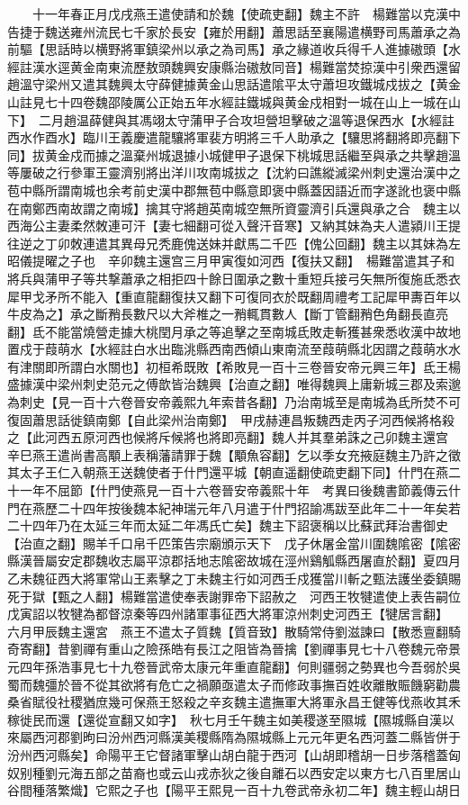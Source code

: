 　　十一年春正月戊戌燕王遣使請和於魏【使疏吏翻】魏主不許　楊難當以克漢中告捷于魏送雍州流民七千家於長安【雍於用翻】蕭思話至襄陽遣横野司馬蕭承之為前驅【思話時以横野將軍鎮梁州以承之為司馬】承之緣道收兵得千人進據磝頭【水經註漢水逕黄金南東流歷敖頭魏興安康縣治磝敖同音】楊難當焚掠漢中引衆西還留趙溫守梁州又遣其魏興太守薛健據黄金山思話遣隂平太守蕭坦攻鐵城戍拔之【黄金山註見七十四卷魏邵陵厲公正始五年水經註鐵城與黄金戍相對一城在山上一城在山下】　二月趙温薛健與其馮翊太守蒲甲子合攻坦營坦擊破之溫等退保西水【水經註西水作酉水】臨川王義慶遣龍驤將軍裴方明將三千人助承之【驤思將翻將即亮翻下同】拔黄金戍而據之溫棄州城退據小城健甲子退保下桃城思話繼至與承之共擊趙溫等屢破之行參軍王靈濟别將出洋川攻南城拔之【沈約曰譙縱滅梁州刺史還治漢中之苞中縣所謂南城也余考前史漢中郡無苞中縣意即褒中縣蓋因語近而字遂訛也褒中縣在南鄭西南故謂之南城】擒其守將趙英南城空無所資靈濟引兵還與承之合　魏主以西海公主妻柔然敇連可汗【妻七細翻可從入聲汗音寒】又納其妹為夫人遣潁川王提往逆之丁卯敇連遣其異母兄秃鹿傀送妹并獻馬二千匹【傀公回翻】魏主以其妹為左昭儀提曜之子也　辛卯魏主還宫三月甲寅復如河西【復扶又翻】　楊難當遣其子和將兵與蒲甲子等共撃蕭承之相拒四十餘日圍承之數十重短兵接弓矢無所復施氐悉衣犀甲戈矛所不能入【重直龍翻復扶又翻下可復同衣於既翻周禮考工記犀甲夀百年以牛皮為之】承之斷矟長數尺以大斧椎之一矟輒貫數人【斷丁管翻矟色角翻長直亮翻】氐不能當燒營走據大桃閏月承之等追擊之至南城氐敗走斬獲甚衆悉收漢中故地置戍于葭萌水【水經註白水出臨洮縣西南西傾山東南流至葭萌縣北因謂之葭萌水水有津關即所謂白水關也】初桓希既敗【希敗見一百十三卷晉安帝元興三年】氐王楊盛據漢中梁州刺史范元之傅歆皆治魏興【治直之翻】唯得魏興上庸新城三郡及索邈為刺史【見一百十六卷晉安帝義熙九年索昔各翻】乃治南城至是南城為氐所焚不可復固蕭思話徙鎮南鄭【自此梁州治南鄭】　甲戌赫連昌叛魏西走丙子河西候將格殺之【此河西五原河西也候將斥候將也將即亮翻】魏人并其羣弟誅之己卯魏主還宫　辛巳燕王遣尚書高顒上表稱藩請罪于魏【顒魚容翻】乞以季女充掖庭魏主乃許之徵其太子王仁入朝燕王送魏使者于什門還平城【朝直遥翻使疏吏翻下同】什門在燕二十一年不屈節【什門使燕見一百十六卷晉安帝義熙十年　考異曰後魏書節義傳云什門在燕歷二十四年按後魏本紀神瑞元年八月遣于什門招諭馮跋至此年二十一年矣若二十四年乃在太延三年而太延二年馮氏亡矣】魏主下詔褒稱以比蘇武拜治書御史【治直之翻】賜羊千口帛千匹策告宗廟頒示天下　戊子休屠金當川圍魏隂密【隂密縣漢晉屬安定郡魏收志屬平涼郡括地志隂密故城在涇州鷄觚縣西屠直於翻】夏四月乙未魏征西大將軍常山王素擊之丁未魏主行如河西壬戍獲當川斬之甄法護坐委鎮賜死于獄【甄之人翻】楊難當遣使奉表謝罪帝下詔赦之　河西王牧犍遣使上表告嗣位戊寅詔以牧犍為都督涼秦等四州諸軍事征西大將軍涼州刺史河西王【犍居言翻】　六月甲辰魏主還宮　燕王不遣太子質魏【質音致】散騎常侍劉滋諫曰【散悉亶翻騎奇寄翻】昔劉禪有重山之險孫皓有長江之阻皆為晉擒【劉禪事見七十八卷魏元帝景元四年孫浩事見七十九卷晉武帝太康元年重直龍翻】何則疆弱之勢異也今吾弱於吳蜀而魏彊於晉不從其欲將有危亡之禍願亟遣太子而修政事撫百姓收離散賑饑窮勸農桑省賦役社稷猶庶幾可保燕王怒殺之辛亥魏主遣撫軍大將軍永昌王健等伐燕收其禾稼徙民而還【還從宣翻又如字】　秋七月壬午魏主如美稷遂至隰城【隰城縣自漢以來屬西河郡劉昫曰汾州西河縣漢美稷縣隋為隰城縣上元元年更名西河蓋二縣皆併于汾州西河縣矣】命陽平王它督諸軍擊山胡白龍于西河【山胡即稽胡一日步落稽蓋匈奴别種劉元海五部之苗裔也或云山戎赤狄之後自離石以西安定以東方七八百里居山谷間種落繁熾】它熙之子也【陽平王熙見一百十九卷武帝永初二年】魏主輕山胡日